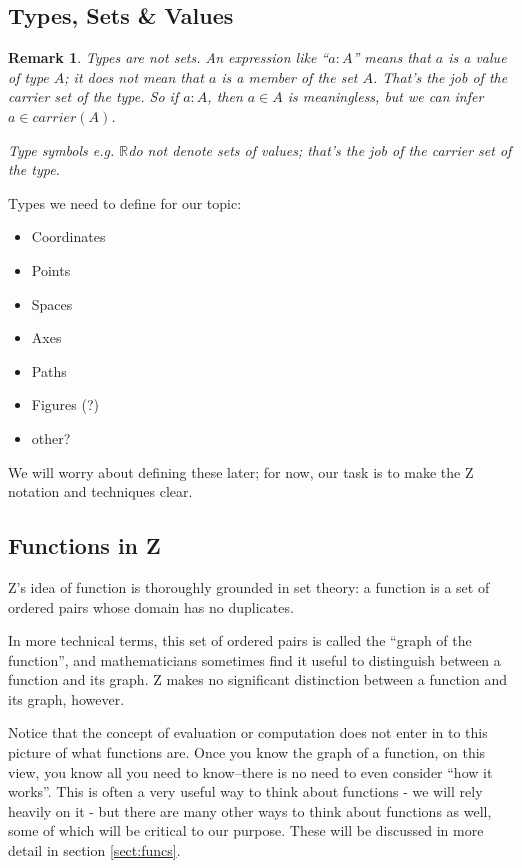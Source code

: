 \documentclass[12pt]{tufte-handout}
\numberwithin{equation}{subsection}
\numberwithin{equation}{subsection}
\newtheorem{remark}{Remark}
\newcommand\R{\(\mathds{R}\)}
\begin{document}
\subsection{Types, Sets \& Values}
\label{sect:types}

\begin{remark}
  Types are not sets. An expression like ``\(a:A\)'' means that \(a\)
  is a value of type \(A\); it does \textit{not} mean that \(a\) is a
  \textit{member} of the set \(A\).  That's the job of the
  \textit{carrier set} of the type.  So if \(a:A\), then \(a\in A\) is
  meaningless, but we can infer \(a\in carrier(A)\).

  Type symbols e.g. \R do not denote sets of values; that's the job of
  the carrier set of the type.
\end{remark}

Types we need to define for our topic:

\begin{itemize}
\item Coordinates
\item Points
\item Spaces
\item Axes
\item Paths
\item Figures (?)
\item other?
\end{itemize}

We will worry about defining these later; for now, our task is to make
the Z notation and techniques clear.

\subsection{Functions in Z}
\label{subs:zfuncs}

Z's idea of function is thoroughly grounded in set theory: a function
is a set of ordered pairs whose domain has no
duplicates.

In more technical terms, this set of ordered pairs is called the
``graph of the function'', and mathematicians sometimes find it useful
to distinguish between a function and its graph.  Z makes no
significant distinction between a function and its graph, however.

Notice that the concept of evaluation or computation does not enter in
to this picture of what functions are.  Once you know the graph of a
function, on this view, you know all you need to know--there is no
need to even consider ``how it works''.  This is often a very useful
way to think about functions - we will rely heavily on it - but there
are many other ways to think about functions as well, some of which
will be critical to our purpose.  These will be discussed in more
detail in section \ref{sect:funcs}.
\end{document}
